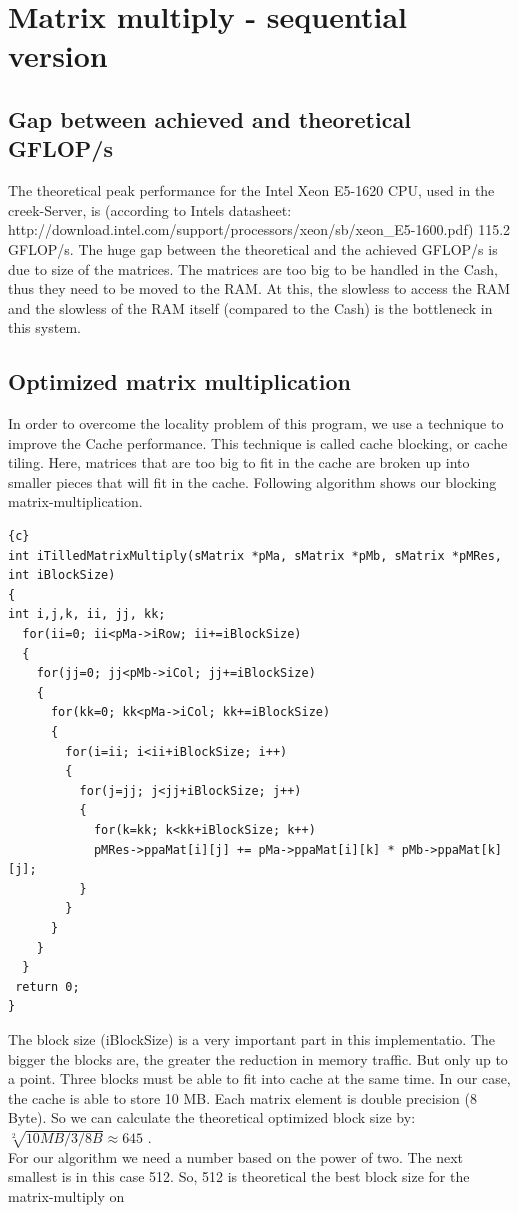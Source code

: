 \documentclass{article}
\newcommand{\enterProblemHeader}[1]{
}
\newcommand{\exitProblemHeader}[1]{
}
\newcounter{homeworkProblemCounter} %
\newcommand{\homeworkProblemName}{}
\newenvironment{homeworkProblem}[1][Problem \arabic{homeworkProblemCounter}]{ %
\stepcounter{homeworkProblemCounter} %
\renewcommand{\homeworkProblemName}{#1} %
\section{\homeworkProblemName} %
}{
}
\begin{document}
\begin{homeworkProblem}[Matrix multiply - sequential version]
\subsection{Gap between achieved and theoretical GFLOP/s}
The theoretical peak performance for the Intel Xeon E5-1620 CPU, used in the creek-Server,
is (according to Intels datasheet: http://download.intel.com/support/processors/xeon/sb/xeon\_E5-1600.pdf)
115.2 GFLOP/s. The huge gap between the theoretical and the achieved GFLOP/s is due to
size of the matrices. The matrices are too big to be handled in the Cash, thus they need
to be moved to the RAM. At this, the slowless to access the RAM and the slowless
of the RAM itself (compared to the Cash) is the bottleneck in this system.
\subsection{Optimized matrix multiplication}
In order to overcome the locality problem of this program, we use a technique to
improve the Cache performance. This technique is called cache blocking, or cache
tiling. Here, matrices that are too big to fit in the cache are broken up into smaller
pieces that will fit in the cache. Following algorithm shows our blocking matrix-multiplication.
\begin{lstlisting}{c}
int iTilledMatrixMultiply(sMatrix *pMa, sMatrix *pMb, sMatrix *pMRes, int iBlockSize)
{
int i,j,k, ii, jj, kk;
  for(ii=0; ii<pMa->iRow; ii+=iBlockSize)
  {
    for(jj=0; jj<pMb->iCol; jj+=iBlockSize)
    {
      for(kk=0; kk<pMa->iCol; kk+=iBlockSize)
      {
        for(i=ii; i<ii+iBlockSize; i++)
        {
          for(j=jj; j<jj+iBlockSize; j++)
          {
            for(k=kk; k<kk+iBlockSize; k++)
            pMRes->ppaMat[i][j] += pMa->ppaMat[i][k] * pMb->ppaMat[k][j];
          }
        } 
      }
    }
  }
 return 0;
}
\end{lstlisting}
The block size (iBlockSize) is a very important part in this implementatio. The bigger
the blocks are, the greater the reduction in memory traffic. But only up to a point.
Three blocks must be able to fit into cache at the same time. In our case, the cache
is able to store 10 MB. Each matrix element is double precision (8 Byte). So we can
calculate the theoretical optimized block size by:
\\$\sqrt[2]{10 MB / 3 / 8 B} \approx 645$ .
\\For our algorithm we need a number based on the power of two. The next smallest is in
this case 512. So, 512 is theoretical the best block size for the matrix-multiply on

\end{homeworkProblem}
\end{document}
